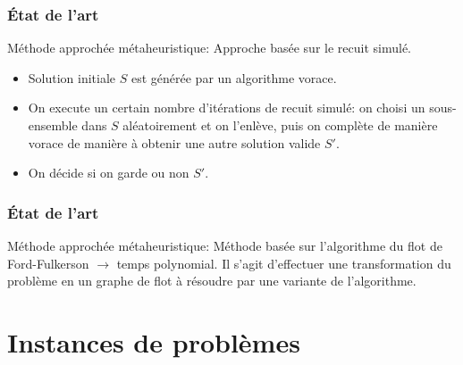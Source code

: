 \documentclass[aspectratio=169,11pt]{beamer}
\begin{document}
	\begin{frame}
		\frametitle{État de l'art}
		\begin{block}{Méthode approchée métaheuristique: \citeauthor{jacobs1995lsh}}
			Approche basée sur le recuit simulé.~\cite{jacobs1995lsh}
			\begin{itemize}
				\item Solution initiale \(S\) est générée par un algorithme vorace.
				\item On execute un certain nombre d'itérations de recuit simulé:
				on choisi un sous-ensemble dans \(S\) aléatoirement
				et on l'enlève, puis on complète de manière vorace de manière à obtenir une autre solution valide \(S'\).
				\item On décide si on garde ou non \(S'\).
			\end{itemize}
		\end{block}
	\end{frame}

	\begin{frame}
		\frametitle{État de l'art}
		\begin{block}{Méthode approchée métaheuristique: \citeauthor{Afif1995}}
			Méthode basée sur l'algorithme du flot de Ford-Fulkerson \(\rightarrow\) temps polynomial. Il s'agit d'effectuer une transformation du problème en un graphe de flot à résoudre par une variante de l'algorithme.~\cite{Afif1995}
		\end{block}
	\end{frame}

	\section{Instances de problèmes}
\end{document}
